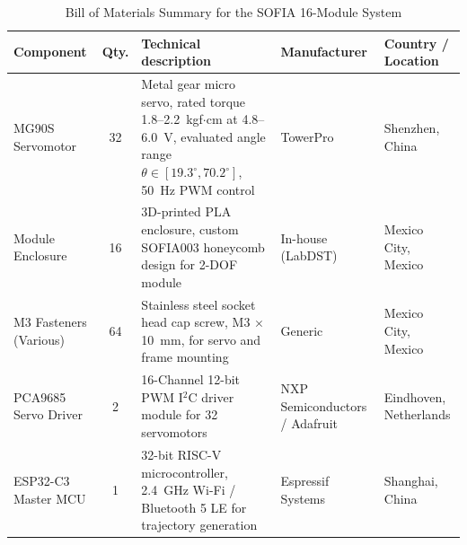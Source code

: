 \documentclass[lettersize,journal]{IEEEtran}
\begin{document}
\begin{table}[ht]
	\centering
	\caption{Bill of Materials Summary for the SOFIA 16-Module System}
	\label{tab:bom_sofia}
	\scriptsize
	\renewcommand{\arraystretch}{1.3}
	\begin{tabular}{p{3.5cm} c p{6.5cm} p{3.0cm} p{3.0cm}}
		\hline
		\textbf{Component} & \textbf{Qty.} & \textbf{Technical description} & \textbf{Manufacturer} & \textbf{Country / Location} \\
		\hline
		MG90S Servomotor & 32 & Metal gear micro servo, rated torque 1.8--2.2~kgf$\cdot$cm at 4.8--6.0~V, evaluated angle range $\theta \in [19.3^\circ, 70.2^\circ]$, 50~Hz PWM control & TowerPro & Shenzhen, China \\
		
		Module Enclosure & 16 & 3D-printed PLA enclosure, custom SOFIA003 honeycomb design for 2-DOF module & In-house (LabDST) & Mexico City, Mexico \\
		
		M3 Fasteners (Various) & 64 & Stainless steel socket head cap screw, M3 $\times$ 10~mm, for servo and frame mounting & Generic & Mexico City, Mexico \\
		
		PCA9685 Servo Driver & 2 & 16-Channel 12-bit PWM I$^2$C driver module for 32 servomotors & NXP Semiconductors / Adafruit & Eindhoven, Netherlands \\
		
		ESP32-C3 Master MCU & 1 & 32-bit RISC-V microcontroller, 2.4~GHz Wi-Fi / Bluetooth 5 LE for trajectory generation & Espressif Systems & Shanghai, China \\
		\hline
	\end{tabular}
\end{table}
\end{document}
